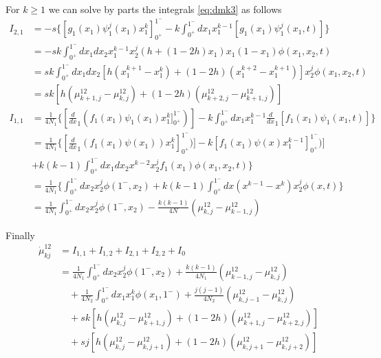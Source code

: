 \documentclass[a4paper, 12pt]{article}
\newcommand{\dev}[1]{\ensuremath{\frac{d}{d #1}}}
\begin{document}
For $k \geq 1$ we can solve by parts the integrals \eqref{eq:dmk3} as follows
\begin{align}
  I_{2,1} &= -s\{[g_1(x_1)\psi_1^j(x_1)x_1^k]_{0^+}^{1^-} - 
  k \int_{0^+}^{1^-} dx_1 x_1^{k -1} [g_1(x_1)\psi_1^j(x_1,t)]\}  
  \nonumber \\
  &= - sk \int_{0^+}^{1^-} dx_1 dx_2 
  x_1^{k -1} x_2^j (h + (1 - 2 h)x_1) x_1 (1 - x_1)\phi(x_1, x_2, t)  
  \nonumber \\
  &= sk \int_{0^+}^{1^-} dx_1 dx_2 [h(x_1^{k + 1} - x_1^{k}) + 
  (1 - 2 h)(x_1^{k + 2} - x_1^{k + 1})]x_2^j\phi(x_1, x_2, t)
  \nonumber \\
  &= sk [h(\mu_{k + 1,j}^{12} - \mu_{k,j}^{12}) + 
  (1 - 2 h)(\mu_{k + 2,j}^{12} - \mu_{k + 1,j}^{12})]
  \label{eq:I21}
  \\
  I_{1,1} &= \frac{1}{4N_1}\{[\dev x_1 (f_1(x_1)\psi_1(x_1)x_1^k]_{0^+}^{1^-})] - 
      k \int_{0^+}^{1^-} dx_1 x_1^{k -1} \dev x_1 [f_1(x_1)\psi_1(x_1,t)]\}
  \nonumber \\
   &= \frac{1}{4N_1}\{[\dev x_1 (f_1(x_1)\psi(x_1))x_1^k]_{0^+}^{1^-})] - 
      k[f_1(x_1)\psi(x)x_1^{k-1}]_{0^+}^{1^-})]
      \nonumber \\
  \quad &+ k(k -1) \int_{0^+}^{1^-} dx_1 dx_2x^{k - 2} x_2^jf_1(x_1)\phi(x_1, x_2,t)\}
  \nonumber \\
   &= \frac{1}{4N_1}\{\int_{0^+}^{1^-} dx_2 x_2^j \phi(1^-,x_2) 
   + k(k -1) \int_{0^+}^{1^-} dx (x^{k - 1} - x^k )x_2^j \phi(x,t)\}
  \nonumber \\
   &= \frac{1}{4N_1}\int_{0^+}^{1^-} dx_2 x_2^j \phi(1^-,x_2) 
   - \frac{k(k-1)}{4N}(\mu_{k,j}^{12}- \mu_{k-1,j}^{12})
\end{align}

Finally
\begin{align}
  \dot \mu_{kj}^{12} &= I_{1,1} + I_{1,2} + I_{2,1} + I_{2,2} + I_0
  \nonumber \\
   &= \frac{1}{4N_1}\int_{0^+}^{1^-} dx_2 x_2^j \phi(1^-,x_2) 
   + \frac{k(k-1)}{4N_1}(\mu_{k-1,j}^{12} -\mu_{k,j}^{12})
   \nonumber \\
   &\quad + \frac{1}{4N_2}\int_{0^+}^{1^-} dx_1 x_1^k \phi(x_1,1^-) 
   + \frac{j(j-1)}{4N_2}(\mu_{k,j-1}^{12} - \mu_{k,j}^{12})
   \nonumber \\
  &\quad + sk [h(\mu_{k,j}^{12} - \mu_{k + 1,j}^{12}) + 
  (1 - 2 h)(\mu_{k + 1,j}^{12} -\mu_{k + 2,j}^{12})]
  \nonumber \\
  &\quad+ sj [h(\mu_{k,j}^{12} - \mu_{k,j + 1}^{12}) + 
  (1 - 2 h)(\mu_{k,j + 1}^{12} -\mu_{k,j + 2}^{12})]
\end{align} 


\footnotesize
\twocolumn
\begin{spacing}{1}


\end{spacing}
\end{document}
